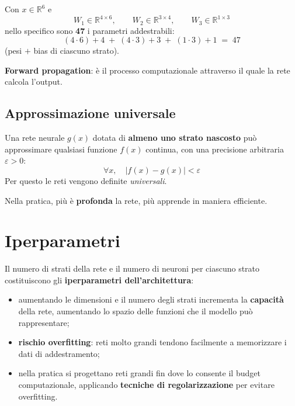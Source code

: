 \documentclass[11pt,a4paper]{article}
\newcommand{\R}{\mathbb{R}}
\begin{document}
\begin{osservazione}
Con $x\in\R^6$ e
\[
W_1\in\R^{4\times 6},\qquad W_2\in\R^{3\times 4},\qquad W_3\in\R^{1\times 3}
\]
nello specifico sono \textbf{47} i parametri addestrabili:
\[
(4\cdot 6)+4 \;+\; (4\cdot 3)+3 \;+\; (1\cdot 3)+1 \;=\; 47
\]
(pesi $+$ bias di ciascuno strato).
\end{osservazione}

\textbf{Forward propagation}: è il processo computazionale attraverso il quale la rete calcola l'output.

\subsection{Approssimazione universale}
\begin{definizione}
Una rete neurale $g(x)$ dotata di \textbf{almeno uno strato nascosto} può approssimare qualsiasi funzione $f(x)$ continua, con una precisione arbitraria $\varepsilon>0$:
\[
\forall x,\quad |f(x)-g(x)| < \varepsilon
\]
Per questo le reti vengono definite \emph{universali}.
\end{definizione}

Nella pratica, più è \textbf{profonda} la rete, più apprende in maniera efficiente.

\section{Iperparametri}

Il numero di strati della rete e il numero di neuroni per ciascuno strato costituiscono gli \textbf{iperparametri dell'architettura}:
\begin{itemize}
  \item aumentando le dimensioni e il numero degli strati incrementa la \textbf{capacità} della rete, aumentando lo spazio delle funzioni che il modello può rappresentare;
  \item \textbf{rischio overfitting}: reti molto grandi tendono facilmente a memorizzare i dati di addestramento;
  \item nella pratica si progettano reti grandi fin dove lo consente il budget computazionale, applicando \textbf{tecniche di regolarizzazione} per evitare overfitting.
\end{itemize}
\end{document}
